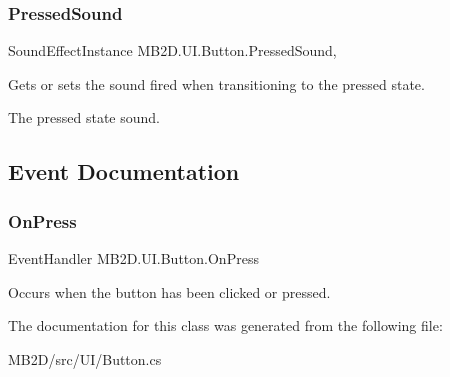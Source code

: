 \subsubsection{\texorpdfstring{Pressed\+Sound}{PressedSound}}
{\footnotesize\ttfamily Sound\+Effect\+Instance M\+B2\+D.\+U\+I.\+Button.\+Pressed\+Sound\hspace{0.3cm}{\ttfamily [get]}, {\ttfamily [set]}}



Gets or sets the sound fired when transitioning to the pressed state. 

The pressed state sound.

\subsection{Event Documentation}
\hypertarget{class_m_b2_d_1_1_u_i_1_1_button_a280d1c552f9e91c7e63811bc498a4f5e}{}\label{class_m_b2_d_1_1_u_i_1_1_button_a280d1c552f9e91c7e63811bc498a4f5e} 
\subsubsection{\texorpdfstring{On\+Press}{OnPress}}
{\footnotesize\ttfamily Event\+Handler M\+B2\+D.\+U\+I.\+Button.\+On\+Press}



Occurs when the button has been clicked or pressed. 



The documentation for this class was generated from the following file\+:\begin{DoxyCompactItemize}
\item 
M\+B2\+D/src/\+U\+I/Button.\+cs\end{DoxyCompactItemize}
